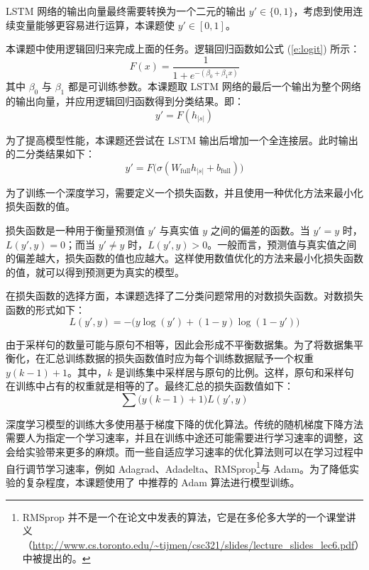 LSTM 网络的输出向量最终需要转换为一个二元的输出 $y' \in \{0, 1\}$，考虑到使用连续变量能够更容易进行运算，本课题使 $y' \in [0, 1]$。

本课题中使用逻辑回归来完成上面的任务。逻辑回归函数如公式 (\ref{e:logit}) 所示：
\begin{equation}
F(x) = \frac{1}{1 + e^{-(\beta_0 + \beta_1 x)}}
\label{e:logit}
\end{equation}
其中 $\beta_0$ 与 $\beta_1$ 都是可训练参数。本课题取 LSTM 网络的最后一个输出为整个网络的输出向量，并应用逻辑回归函数得到分类结果。即：
\begin{equation}
y' = F(h_{|s|})
\end{equation}

为了提高模型性能，本课题还尝试在 LSTM 输出后增加一个全连接层。此时输出的二分类结果如下：
\begin{equation}
y' = F\bigl(\sigma(W_\text{full} h_{|s|} + b_\text{full})\bigr)
\end{equation}

\label{s:classifer p-training}
为了训练一个深度学习，需要定义一个损失函数，并且使用一种优化方法来最小化损失函数的值。

损失函数是一种用于衡量预测值 $y'$ 与真实值 $y$ 之间的偏差的函数。当 $y' = y$ 时，$L(y', y) = 0$；而当 $y' \neq y$ 时，$L(y', y) > 0$。一般而言，预测值与真实值之间的偏差越大，损失函数的值也应越大。这样使用数值优化的方法来最小化损失函数的值，就可以得到预测更为真实的模型。

在损失函数的选择方面，本课题选择了二分类问题常用的对数损失函数。对数损失函数的形式如下：
\begin{equation}
L(y', y) = -\bigl(y \log(y') + (1 - y) \log(1 - y')\bigr)
\end{equation}

由于采样句的数量可能与原句不相等，因此会形成不平衡数据集。为了将数据集平衡化，在汇总训练数据的损失函数值时应为每个训练数据赋予一个权重 $y(k - 1) + 1$。其中，$k$ 是训练集中采样居与原句的比例。这样，原句和采样句在训练中占有的权重就是相等的了。最终汇总的损失函数值如下：
\begin{equation}
\sum\bigl(y(k - 1) + 1\bigr) L(y', y)
\end{equation}

深度学习模型的训练大多使用基于梯度下降的优化算法。传统的随机梯度下降方法需要人为指定一个学习速率，并且在训练中途还可能需要进行学习速率的调整，这会给实验带来更多的麻烦。而一些自适应学习速率的优化算法则可以在学习过程中自行调节学习速率，例如 Adagrad、Adadelta、RMSprop\footnote{RMSprop 并不是一个在论文中发表的算法，它是在多伦多大学的一个课堂讲义（\url{http://www.cs.toronto.edu/~tijmen/csc321/slides/lecture_slides_lec6.pdf}）中被提出的。}与 Adam。为了降低实验的复杂程度，本课题使用了 \cite{Ruder2016} 中推荐的 Adam 算法进行模型训练。

